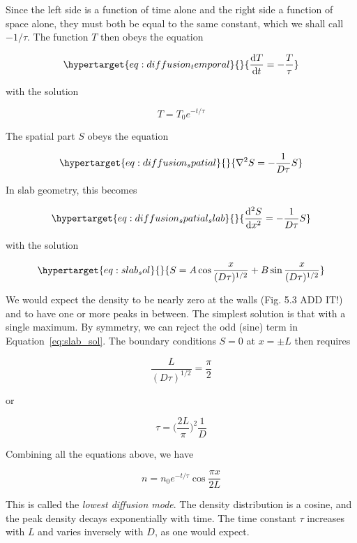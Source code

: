 \documentclass[
  notoc %
]{tufte-book}
\begin{document}
Since the left side is a function of time alone and the right side a
function of space alone, they must both be equal to the same constant,
which we shall call \(-1/\tau\). The function \(T\) then obeys the
equation

\begin{equation}\protect\hypertarget{eq:diffusion_temporal}{}{
\frac{\mathrm{d}T}{\mathrm{d}t} = -\frac{T}{\tau}
}\label{eq:diffusion_temporal}\end{equation}

with the solution

\[
T = T_0 e^{-t/\tau}
\]

The spatial part \(S\) obeys the equation

\begin{equation}\protect\hypertarget{eq:diffusion_spatial}{}{
\nabla^2 S = -\frac{1}{D\tau} S
}\label{eq:diffusion_spatial}\end{equation}

In slab geometry, this becomes

\begin{equation}\protect\hypertarget{eq:diffusion_spatial_slab}{}{
\frac{\mathrm{d}^2 S}{\mathrm{d}x^2} = -\frac{1}{D\tau}S
}\label{eq:diffusion_spatial_slab}\end{equation}

with the solution

\begin{equation}\protect\hypertarget{eq:slab_sol}{}{
S = A\cos\frac{x}{(D\tau)^{1/2}} + B\sin\frac{x}{(D\tau)^{1/2}}
}\label{eq:slab_sol}\end{equation}

We would expect the density to be nearly zero at the walls (Fig. 5.3 ADD
IT!) and to have one or more peaks in between. The simplest solution is
that with a single maximum. By symmetry, we can reject the odd (sine)
term in Equation~\ref{eq:slab_sol}. The boundary conditions \(S=0\) at
\(x=\pm L\) then requires

\[
\frac{L}{(D\tau)^{1/2}} = \frac{\pi}{2}
\]

or

\[
\tau = \Big( \frac{2L}{\pi} \Big)^2 \frac{1}{D}
\]

Combining all the equations above, we have

\[
n = n_0 e^{-t/\tau} \cos\frac{\pi x}{2L}
\]

This is called the \emph{lowest diffusion mode}. The density
distribution is a cosine, and the peak density decays exponentially with
time. The time constant \(\tau\) increases with \(L\) and varies
inversely with \(D\), as one would expect.
\end{document}
